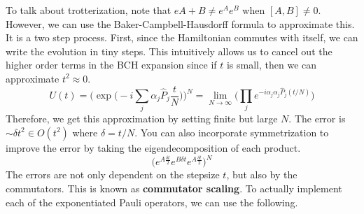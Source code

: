 \documentclass{article}
\begin{document}
  To talk about trotterization, note that $e{A + B} \neq e^A e^B$ when $[A, B] \neq 0$. However, we can use the Baker-Campbell-Hausdorff formula to approximate this. It is a two step process. First, since the Hamiltonian commutes with itself, we can write the evolution in tiny steps. This intuitively allows us to cancel out the higher order terms in the BCH expansion since if $t$ is small, then we can approximate $t^2 \approx 0$.  
  \begin{equation} 
    U(t) = \bigg( \exp \bigg( -i \sum_j \alpha_j \hat{P}_j \frac{t}{N} \bigg)\bigg)^N = \lim_{N \rightarrow \infty} \bigg( \prod_j e^{-i \alpha_j \alpha_j \hat{P}_j (t /N)} \bigg)
  \end{equation}
  Therefore, we get this approximation by setting finite but large $N$. The error is $\sim \delta t^2 \in O(t^2)$ where $\delta = t / N$. You can also incorporate symmetrization to improve the error by taking the eigendecomposition of each product. 
  \begin{equation}
    \big( e^{A \frac{\delta t}{2}} e^{B \delta t} e^{A \frac{\delta t}{2} }\big)^N
  \end{equation}
  The errors are not only dependent on the stepsize $t$, but also by the commutators. This is known as \textbf{commutator scaling}. To actually implement each of the exponentiated Pauli operators, we can use the following. 
\end{document}
